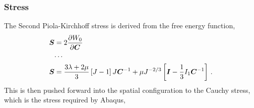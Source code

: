 \documentclass[10pt,letterpaper,oneside]{report}
\newcommand{\ten}[1]{\mbox{\boldmath $#1$}{}}
\begin{document}
\subsubsection{Stress}
The Second Piola-Kirchhoff stress is derived from the free energy function, 
\begin{align}
\ten{S} ={}& 2 \frac{\partial W_0}{\partial \ten{C}}  
\\
\cdots{}& \notag \\
\ten{S} ={}& \frac{3 \lambda + 2 \mu}{3} \left[ J - 1 \right] J \ten{C}^{-1} + \mu J^{-2/3} \left[ \ten{I} - \frac{1}{3} I_1 \ten{C}^{-1} \right] \, . 
\end{align}
This is then pushed forward into the spatial configuration to the Cauchy stress, which is the stress required by Abaqus, 
\end{document}
